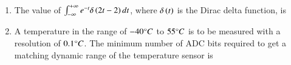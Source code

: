 \documentclass[journal,12pt,onecolumn]{IEEEtran}
\theoremstyle{remark}
\begin{document}
\begin{enumerate}[start=1, label=Q.\arabic*]
    \hfill{}

    \item The value of $\int_{-\infty}^{+\infty}e^{-t}\delta\left(2t-2\right) dt$, where $\delta\left(t\right)$ is the Dirac delta function, is
    \begin{enumerate}
    \end{enumerate}

    \hfill{}

    \item A temperature in the range of $-40\degree C$ to $55\degree C$ is to be measured with a resolution of $0.1\degree C$. The minimum number of ADC bits required to get a matching dynamic range of the temperature sensor is
    \begin{enumerate}
    \end{enumerate}

    \hfill{}


\end{enumerate}
\end{document}
